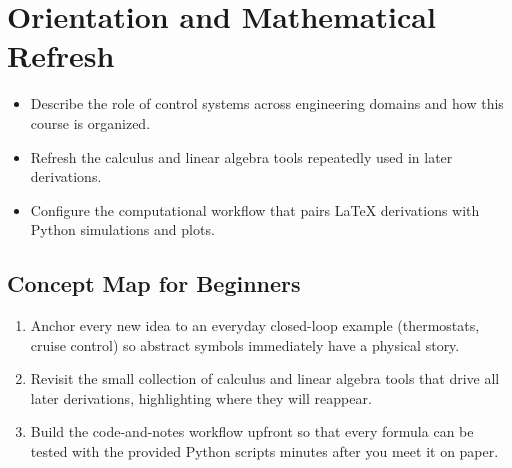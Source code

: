 \chapter{Orientation and Mathematical Refresh}
\label{chap:orientation}

\begin{learningobjective}
\begin{itemize}[leftmargin=*]
    \item Describe the role of control systems across engineering domains and how this course is organized.
    \item Refresh the calculus and linear algebra tools repeatedly used in later derivations.
    \item Configure the computational workflow that pairs LaTeX derivations with Python simulations and plots.
\end{itemize}
\end{learningobjective}

\section{Concept Map for Beginners}
\begin{conceptroadmap}
\begin{enumerate}[leftmargin=*]
    \item Anchor every new idea to an everyday closed-loop example (thermostats, cruise control) so abstract symbols immediately have a physical story.
    \item Revisit the small collection of calculus and linear algebra tools that drive all later derivations, highlighting where they will reappear.
    \item Build the code-and-notes workflow upfront so that every formula can be tested with the provided Python scripts minutes after you meet it on paper.
\end{enumerate}
\end{conceptroadmap}

